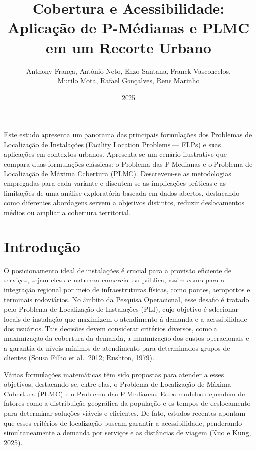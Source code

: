 \documentclass[12pt]{article}
\title{Cobertura e Acessibilidade: Aplicação de P-Médianas e PLMC em um Recorte Urbano}
\author{Anthony França, Antônio Neto, Enzo Santana, Franck Vasconcelos,\\
Murilo Mota, Rafael Gonçalves, Rene Marinho}
\date{2025}
\begin{document}
 

\maketitle
     
\begin{resumo}
Este estudo apresenta um panorama das principais formulações dos Problemas de Localização de Instalações (Facility Location Problems — FLPs) e suas aplicações em contextos urbanos. Apresenta-se um cenário ilustrativo que compara duas formulações clássicas: o Problema das P-Medianas e o Problema de Localização de Máxima Cobertura (PLMC). Descrevem-se as metodologias empregadas para cada variante e discutem-se as implicações práticas e as limitações de uma análise exploratória baseada em dados abertos, destacando como diferentes abordagens servem a objetivos distintos, reduzir deslocamentos médios ou ampliar a cobertura territorial.
\end{resumo}

\section{Introdução}

O posicionamento ideal de instalações é crucial para a provisão eficiente de serviços, sejam eles de natureza comercial ou pública, assim como para a integração regional por meio de infraestruturas físicas, como pontes, aeroportos e terminais rodoviários. No âmbito da Pesquisa Operacional, esse desafio é tratado pelo Problema de Localização de Instalações (PLI), cujo objetivo é selecionar locais de instalação que maximizem o atendimento à demanda e a acessibilidade dos usuários. Tais decisões devem considerar critérios diversos, como a maximização da cobertura da demanda, a minimização dos custos operacionais e a garantia de níveis mínimos de atendimento para determinados grupos de clientes (Sousa Filho et al., 2012; Rushton, 1979).

Várias formulações matemáticas têm sido propostas para atender a esses objetivos, destacando-se, entre elas, o Problema de Localização de Máxima Cobertura (PLMC) e o Problema das P-Medianas. Esses modelos dependem de fatores como a distribuição geográfica da população e os tempos de deslocamento para determinar soluções viáveis e eficientes. De fato, estudos recentes apontam que esses critérios de localização buscam garantir a acessibilidade, ponderando simultaneamente a demanda por serviços e as distâncias de viagem (Kuo e Kung, 2025).
\end{document}
